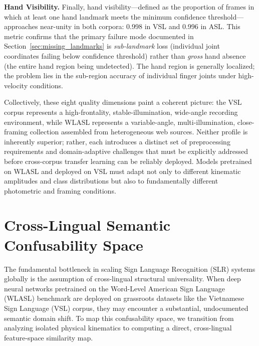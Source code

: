 \documentclass{ieeeaccess}
\DeclareRobustCommand{\textbf}[1]{{\bfseries #1}}
\begin{document}
\textbf{Hand Visibility.} Finally, hand visibility—defined as the proportion of frames in which at least one hand landmark meets the minimum confidence threshold—approaches near-unity in both corpora: 0.998 in VSL and 0.996 in ASL. This metric confirms that the primary failure mode documented in Section~\ref{sec:missing_landmarks} is \textit{sub-landmark} loss (individual joint coordinates failing below confidence threshold) rather than \textit{gross} hand absence (the entire hand region being undetected). The hand region is generally localized; the problem lies in the sub-region accuracy of individual finger joints under high-velocity conditions.

Collectively, these eight quality dimensions paint a coherent picture: the VSL corpus represents a high-frontality, stable-illumination, wide-angle recording environment, while WLASL represents a variable-angle, multi-illumination, close-framing collection assembled from heterogeneous web sources. Neither profile is inherently superior; rather, each introduces a distinct set of preprocessing requirements and domain-adaptive challenges that must be explicitly addressed before cross-corpus transfer learning can be reliably deployed. Models pretrained on WLASL and deployed on VSL must adapt not only to different kinematic amplitudes and class distributions but also to fundamentally different photometric and framing conditions.

\section{Cross-Lingual Semantic Confusability Space} \label{sec:similarity}

The fundamental bottleneck in scaling Sign Language Recognition (SLR) systems globally is the assumption of cross-lingual structural universality. When deep neural networks pretrained on the Word-Level American Sign Language (WLASL) benchmark are deployed on grassroots datasets like the Vietnamese Sign Language (VSL) corpus, they may encounter a substantial, undocumented semantic domain shift. To map this confusability space, we transition from analyzing isolated physical kinematics to computing a direct, cross-lingual feature-space similarity map.

\end{document}
